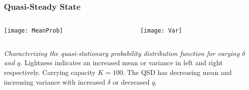 \documentclass[dvipsnames]{beamer}
\begin{document}


\begin{frame}
\frametitle{Quasi-Steady State}
\begin{columns}
\begin{column}{5.5cm}
	\begin{center}
		\texttt{[image: MeanProb]}
	\end{center}
\end{column}
\begin{column}{5.5cm}
	\begin{center}
		\texttt{[image: Var]}
	\end{center}
\end{column}
\end{columns}
\justifying
\emph{Characterizing the quasi-stationary probability distribution function for varying $\delta$ and $q$.} 
Lightness indicates an increased mean or variance in left and right respectively. Carrying capacity $K=100$. 
The QSD has decreasing mean and increasing variance with increased $\delta$ or decreased $q$. 
\end{frame}
\end{document}
